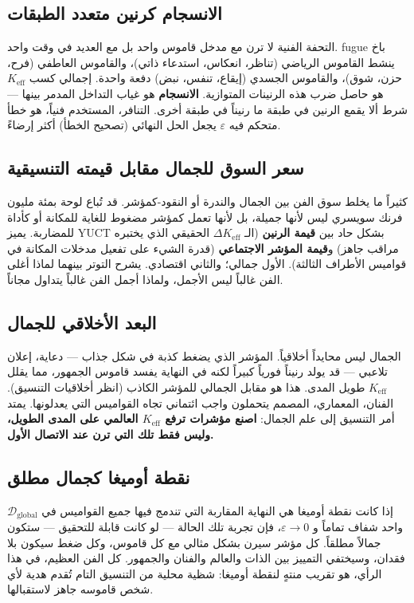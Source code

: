 \documentclass[12pt,a4paper]{article}
\newcommand{\Keff}{K_{\mathrm{eff}}}
\begin{document}
	\subsection{الانسجام كرنين متعدد الطبقات}
	
	التحفة الفنية لا ترن مع مدخل قاموس واحد بل مع العديد في وقت واحد. fugue باخ ينشط القاموس الرياضي (تناظر، انعكاس، استدعاء ذاتي)، والقاموس العاطفي (فرح، حزن، شوق)، والقاموس الجسدي (إيقاع، تنفس، نبض) دفعة واحدة. إجمالي كسب \(K_{\mathrm{eff}}\) هو حاصل ضرب هذه الرنينات المتوازية. \textbf{الانسجام} هو غياب التداخل المدمر بينها — شرط ألا يقمع الرنين في طبقة ما رنيناً في طبقة أخرى. التنافر، المستخدم فنياً، هو خطأ متحكم فيه \(\varepsilon\) يجعل الحل النهائي (تصحيح الخطأ) أكثر إرضاءً.
	
	\subsection{سعر السوق للجمال مقابل قيمته التنسيقية}
	
	كثيراً ما يخلط سوق الفن بين الجمال والندرة أو النقود-كمؤشر. قد تُباع لوحة بمئة مليون فرنك سويسري ليس لأنها جميلة، بل لأنها تعمل كمؤشر مضغوط للغاية للمكانة أو كأداة للمضاربة. يميز YUCT بشكل حاد بين \textbf{قيمة الرنين} (الـ \(\Delta\Keff\) الحقيقي الذي يختبره مراقب جاهز) و\textbf{قيمة المؤشر الاجتماعي} (قدرة الشيء على تفعيل مدخلات المكانة في قواميس الأطراف الثالثة). الأول جمالي؛ والثاني اقتصادي. يشرح التوتر بينهما لماذا أغلى الفن غالباً ليس الأجمل، ولماذا أجمل الفن غالباً يتداول مجاناً.
	
	\subsection{البعد الأخلاقي للجمال}
	
	الجمال ليس محايداً أخلاقياً. المؤشر الذي يضغط كذبة في شكل جذاب — دعاية، إعلان تلاعبي — قد يولد رنيناً فورياً كبيراً لكنه في النهاية يفسد قاموس الجمهور، مما يقلل \(K_{\mathrm{eff}}\) طويل المدى. هذا هو مقابل الجمالي للمؤشر الكاذب (انظر أخلاقيات التنسيق). الفنان، المعماري، المصمم يتحملون واجب ائتماني تجاه القواميس التي يعدلونها. يمتد أمر التنسيق إلى علم الجمال: \textbf{اصنع مؤشرات ترفع \(K_{\mathrm{eff}}\) العالمي على المدى الطويل، وليس فقط تلك التي ترن عند الاتصال الأول.}
	
	\subsection{نقطة أوميغا كجمال مطلق}
	
	إذا كانت نقطة أوميغا هي النهاية المقاربة التي تندمج فيها جميع القواميس في \(\mathcal{D}_{\text{global}}\) واحد شفاف تماماً و \(\varepsilon \to 0\)، فإن تجربة تلك الحالة — لو كانت قابلة للتحقيق — ستكون جمالاً مطلقاً. كل مؤشر سيرن بشكل مثالي مع كل قاموس، وكل ضغط سيكون بلا فقدان، وسيختفي التمييز بين الذات والعالم والفنان والجمهور. كل الفن العظيم، في هذا الرأي، هو تقريب منتهٍ لنقطة أوميغا: شظية محلية من التنسيق التام تُقدم هدية لأي شخص قاموسه جاهز لاستقبالها.
	
\end{document}

